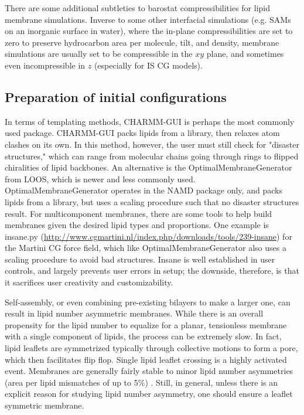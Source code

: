 \documentclass[9pt,bestpractices]{livecoms}
\begin{document}
There are some additional subtleties to barostat compressibilities for lipid membrane simulations.
Inverse to some other interfacial simulations (e.g. SAMs on an inorganic surface in water), where the in-plane compressibilities are set to zero to preserve hydrocarbon area per molecule, tilt, and density, membrane simulations are usually set to be compressible in the $xy$ plane, and sometimes even incompressible in $z$ (especially for IS CG models).

\subsection{Preparation of initial configurations}
\label{subsec:prepconf4}

\parbox{8.5cm}{\sloppy
In terms of templating methods, CHARMM-GUI is perhaps the most commonly used package.
CHARMM-GUI packs lipids from a library, then relaxes atom clashes on its own.
In this method, however, the user must still check for "disaster structures," which can range from molecular chains going through rings to flipped chiralities of lipid backbones.
An alternative is the OptimalMembraneGenerator from LOOS, which is newer and less commonly used.
OptimalMembraneGenerator operates in the NAMD package only, and packs lipids from a library, but uses a scaling procedure such that no disaster structures result.
For multicomponent membranes, there are some tools to help build membranes given the desired lipid types and proportions.
One example is insane.py (\url{http://www.cgmartini.nl/index.php/downloads/tools/239-insane}) for the Martini CG force field, which like OptimalMembraneGenerator also uses a scaling procedure to avoid bad structures.
Insane is well established in user controls, and largely prevents user errors in setup; the downside, therefore, is that it sacrifices user creativity and customizability.}

Self-assembly, or even combining pre-existing bilayers to make a larger one, can result in lipid number asymmetric membranes.
While there is an overall propensity for the lipid number to equalize for a planar, tensionless membrane with a single component of lipids, the process can be extremely slow.
In fact, lipid leaflets are symmetrized typically through collective motions to form a pore, which then facilitates flip flop.
Single lipid leaflet crossing is a highly activated event.
Membranes are generally fairly stable to minor lipid number asymmetries (area per lipid mismatches of up to 5\%) \cite{Park2015a}.
Still, in general, unless there is an explicit reason for studying lipid number asymmetry, one should ensure a leaflet symmetric membrane.
\end{document}
